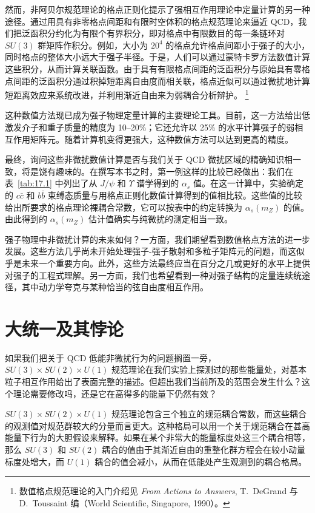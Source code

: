 然而，非阿贝尔规范理论的格点正则化提示了强相互作用理论中定量计算的另一种途径。通过用具有非零格点间距和有限时空体积的格点规范理论来逼近 QCD，我们把泛函积分约化为有限个有界积分，即对格点中有限数目的每一条链环对 $SU(3)$ 群矩阵作积分。例如，大小为 $20^4$ 的格点允许格点间距小于强子的大小，同时格点的整体大小远大于强子半径。于是，人们可以通过蒙特卡罗方法数值计算这些积分，从而计算关联函数。由于具有有限格点间距的泛函积分与原始具有零格点间距的泛函积分通过积掉短距离自由度而相关联，格点近似可以通过微扰地计算短距离效应来系统改进，并利用渐近自由来为弱耦合分析辩护。%
\footnote{数值格点规范理论的入门介绍见 \emph{From Actions to Answers}, T.~DeGrand 与 D.~Toussaint 编（World Scientific, Singapore, 1990）。}

这种数值方法现已成为强子物理定量计算的主要理论工具。目前，这一方法给出低激发介子和重子质量的精度为 10--20\%；它还允许以 25\% 的水平计算强子的弱相互作用矩阵元。随着计算机变得更强大，这种数值方法可以达到更高的精度。

最终，询问这些非微扰数值计算是否与我们关于 QCD 微扰区域的精确知识相一致，将是饶有趣味的。在撰写本书之时，第一例这样的比较已经做出：我们在表~\ref{tab:17.1} 中列出了从 $J/\psi$ 和 $\Upsilon$ 谱学得到的 $\alpha_s$ 值。在这一计算中，实验确定的 $c\bar{c}$ 和 $b\bar{b}$ 束缚态质量与用格点正则化数值计算得到的值相比较。这些值的比较给出所要求的格点理论裸耦合常数，它可以按表中的约定转换为 $\alpha_s(m_Z)$ 的值。由此得到的 $\alpha_s(m_Z)$ 估计值确实与纯微扰的测定相当一致。

强子物理中非微扰计算的未来如何？一方面，我们期望看到数值格点方法的进一步发展。这些方法几乎尚未开始处理强子-强子散射和多粒子矩阵元的问题，而这似乎是未来一个重要方向。此外，这些方法最终应当在百分之几或更好的水平上提供对强子的工程式理解。另一方面，我们也希望看到一种对强子结构的定量连续统途径，其中动力学夸克与某种恰当的弦自由度相互作用。

\section{大统一及其悖论}

如果我们把关于 QCD 低能非微扰行为的问题搁置一旁，$SU(3)\times SU(2)\times U(1)$ 规范理论在我们实验上探测过的那些能量处，对基本粒子相互作用给出了表面完整的描述。但超出我们当前所及的范围会发生什么？这个理论需要修改吗，还是它在高得多的能量下仍然有效？

$SU(3)\times SU(2)\times U(1)$ 规范理论包含三个独立的规范耦合常数，而这些耦合的观测值对规范群较大的分量而言更大。这种格局可以用一个关于规范耦合在甚高能量下行为的大胆假设来解释。如果在某个非常大的能量标度处这三个耦合相等，那么 $SU(3)$ 和 $SU(2)$ 耦合的值由于其渐近自由的重整化群方程会在较小动量标度处增大，而 $U(1)$ 耦合的值会减小，从而在低能处产生观测到的耦合格局。

